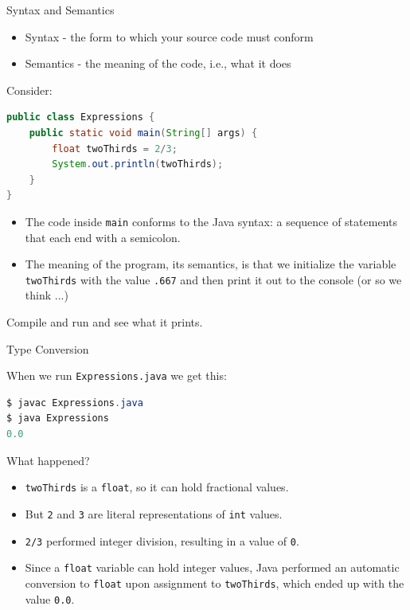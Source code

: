 \documentclass{beamer}
\begin{document}
\begin{frame}[fragile]{Syntax and Semantics}


\begin{itemize}
\item Syntax - the form to which your source code must conform
\item Semantics - the meaning of the code, i.e., what it does
\end{itemize}
Consider:
\begin{lstlisting}[language=Java]
public class Expressions {
    public static void main(String[] args) {
        float twoThirds = 2/3;
        System.out.println(twoThirds);
    }
}
\end{lstlisting}

\begin{itemize}
\item The code inside {\tt main} conforms to the Java syntax: a sequence of statements that each end with a semicolon.
\item The meaning of the program, its semantics, is that we initialize the variable {\tt twoThirds} with the value {\tt .667} and then print it out to the console (or so we think ...)
\end{itemize}

Compile and run  and see what it prints.

\end{frame}

\begin{frame}[fragile]{Type Conversion}


When we run {\tt Expressions.java} we get this:
\begin{lstlisting}[language=Java]
$ javac Expressions.java
$ java Expressions
0.0
\end{lstlisting}

What happened?

\begin{itemize}
\item {\tt twoThirds} is a {\tt float}, so it can hold fractional values.
\item But {\tt 2} and {\tt 3} are literal representations of {\tt int} values.
\item {\tt 2/3} performed integer division, resulting in a value of {\tt 0}.
\item Since a {\tt float} variable can hold integer values, Java performed an automatic conversion to {\tt float} upon assignment to {\tt twoThirds}, which ended up with the value {\tt 0.0}.
\end{itemize}

\end{frame}
\end{document}
